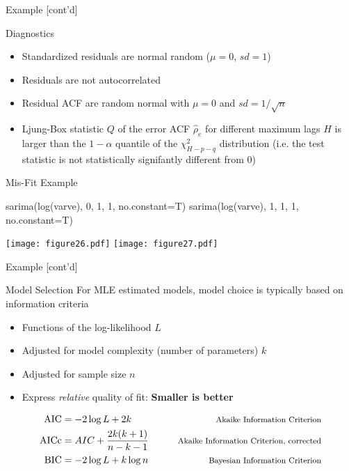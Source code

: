 \documentclass[ignorenonframetext,xcolor=x11names]{beamer}
\begin{document}
\begin{frame}{Example \small [cont'd]}
\begin{block}{Diagnostics}
\begin{itemize}
   \item Standardized residuals are normal random ($\mu=0$, $sd=1$)
   \item Residuals are not autocorrelated
   \item Residual ACF are random normal with $\mu=0$ and $sd=1/\sqrt{n}$
   \item Ljung-Box statistic $Q$ of the error ACF $\hat\rho_e$ for different maximum lags $H$ is larger than the $1-\alpha$ quantile of the $\chi^2_{H-p-q}$ distribution (i.e. the test statistic is not statistically signifantly different from $0$)
\end{itemize}
\end{block}
\end{frame}

\begin{frame}[fragile]{Mis-Fit Example}
\begin{Rcode}
sarima(log(varve), 0, 1, 1, no.constant=T)
sarima(log(varve), 1, 1, 1, no.constant=T)
\end{Rcode}
\begin{center}
\texttt{[image: figure26.pdf]}
\texttt{[image: figure27.pdf]}
\end{center}
\end{frame}

\begin{frame}[fragile]{Example \small [cont'd]}
\begin{block}{Model Selection}
For MLE estimated models, model choice is typically based on information criteria
\begin{itemize}
   \item Functions of the log-likelihood $L$
   \item Adjusted for model complexity (number of parameters) $k$
   \item Adjusted for sample size $n$
   \item Express \emph{relative} quality of fit: \textbf{Smaller is better}
\end{itemize}
\begin{align*}
\operatorname{AIC} &= -2 \log L + 2k  &\qquad \text{\footnotesize Akaike Information Criterion}\\
\operatorname{AICc} &= AIC + \frac{2k(k+1)}{n-k-1} &\qquad \text{\footnotesize Akaike Information Criterion, corrected}\\
\operatorname{BIC} &= -2 \log L + k \log n &\qquad \text{\footnotesize Bayesian Information Criterion}
\end{align*}
\end{block}
\end{frame}
\end{document}

